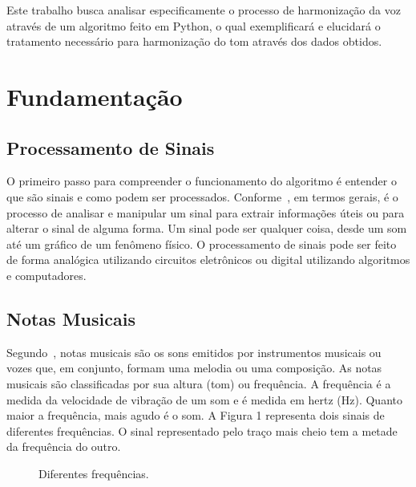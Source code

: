 \documentclass{sbrt}
\begin{document}
Este trabalho busca analisar especificamente o processo de harmonização da voz através de um algoritmo feito em Python, o qual exemplificará e elucidará o tratamento necessário para harmonização do tom através dos dados obtidos.


\section{Fundamentação}

\subsection{Processamento de Sinais}

O primeiro passo para compreender o funcionamento do algoritmo é entender o que são sinais e como podem ser processados. Conforme~\cite{prandoni2008signal}, em termos gerais, é o processo de analisar e manipular um sinal para extrair informações úteis ou para alterar o sinal de alguma forma. Um sinal pode ser qualquer coisa, desde um som até um gráfico de um fenômeno físico. O processamento de sinais pode ser feito de forma analógica utilizando circuitos eletrônicos ou digital utilizando algoritmos e computadores.

\subsection{Notas Musicais}

Segundo~\cite{moretti2003prototipo}, notas musicais são os sons emitidos por instrumentos musicais ou vozes que, em conjunto, formam uma melodia ou uma composição. As notas musicais são classificadas por sua altura (tom) ou frequência. A frequência é a medida da velocidade de vibração de um som e é medida em hertz (Hz). Quanto maior a frequência, mais agudo é o som. A Figura 1 representa dois sinais de diferentes frequências. O sinal representado pelo traço mais cheio tem a metade da frequência do outro.


\begin{figure}[ht]
  \centering
  \caption{\label{fig:sine}Diferentes frequências.}
\end{figure}
\end{document}
